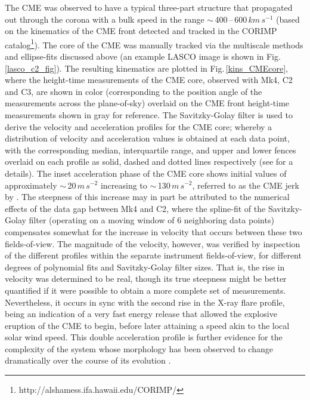 \documentclass[namedreferences]{solarphysics}
\begin{document}
\begin{article}
The CME was observed to have a typical three-part structure that propagated out through the corona with a bulk speed in the range $\sim$\,400\,--\,600$\,km\,s^{-1}$ (based on the kinematics of the CME front detected and tracked in the CORIMP catalog\footnote{http://alshamess.ifa.hawaii.edu/CORIMP/}). The core of the CME was manually tracked via the multiscale methods and ellipse-fits discussed above (an example LASCO image is shown in Fig.\,\ref{lasco_c2_fig}). The resulting kinematics are plotted in Fig.\,\ref{kins_CMEcore}, where the height-time measurements of the CME core, observed with Mk4, C2 and C3, are shown in color (corresponding to the position angle of the measurements across the plane-of-sky) overlaid on the CME front height-time measurements shown in gray for reference. The Savitzky-Golay filter is used to derive the velocity and acceleration profiles for the CME core; whereby a distribution of velocity and acceleration values is obtained at each data point, with the corresponding median, interquartile range, and upper and lower fences overlaid on each profile as solid, dashed and dotted lines respectively (see  for a details). The inset acceleration phase of the CME core shows initial values of approximately $\sim$\,20$\,m\,s^{-2}$ increasing to $\sim$\,130$\,m\,s^{-2}$, referred to as the CME jerk by . The steepness of this increase may in part be attributed to the numerical effects of the data gap between Mk4 and C2, where the spline-fit of the Savitzky-Golay filter (operating on a moving window of 6 neighboring data points) compensates somewhat for the increase in velocity that occurs between these two fields-of-view. The magnitude of the velocity, however, was verified by inspection of the different profiles within the separate instrument fields-of-view, for different degrees of polynomial fits and Savitzky-Golay filter sizes. That is, the rise in velocity was determined to be real, though its true steepness might be better quantified if it were possible to obtain a more complete set of measurements. Nevertheless, it occurs in sync with the second rise in the X-ray flare profile, being an indication of a very fast energy release that allowed the explosive eruption of the CME to begin, before later attaining a speed akin to the local solar wind speed. This double acceleration profile is further evidence for the complexity of the system whose morphology has been observed to change dramatically over the course of its evolution \cite{2012ApJ...746L...5S,2013ApJS..206...19M}.




\end{article}
\end{document}
